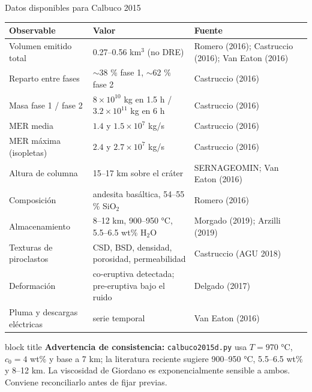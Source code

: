 \documentclass[aspectratio=169,10pt,t]{beamer}
\newcommand{\MER}{\mathrm{MER}}
\newcommand{\mensaje}[1]{%
  \vfill
  \begin{beamercolorbox}[wd=\linewidth,sep=0.4em,rounded=true]{block title}
  \footnotesize #1
  \end{beamercolorbox}}
\begin{document}
\begin{frame}{Datos disponibles para Calbuco 2015}
\centering\scriptsize
\begin{tabular}{@{}p{}p{}p{}@{}}
\toprule
\textbf{Observable} & \textbf{Valor} & \textbf{Fuente} \\
\midrule
Volumen emitido total & 0.27–0.56 km$^3$ (no DRE) & Romero (2016); Castruccio (2016); Van Eaton (2016) \\
Reparto entre fases & $\sim$38 \% fase 1, $\sim$62 \% fase 2 & Castruccio (2016) \\
Masa fase 1 / fase 2 & $8\times10^{10}$ kg en 1.5 h / $3.2\times10^{11}$ kg en 6 h & Castruccio (2016) \\
$\MER$ media & $1.4$ y $1.5\times10^7$ kg/s & Castruccio (2016) \\
$\MER$ máxima (isopletas) & $2.4$ y $2.7\times10^7$ kg/s & Castruccio (2016) \\
Altura de columna & 15–17 km sobre el cráter & SERNAGEOMIN; Van Eaton (2016) \\
Composición & andesita basáltica, 54–55 \% SiO$_2$ & Romero (2016) \\
Almacenamiento & 8–12 km, 900–950 °C, 5.5–6.5 wt\% H$_2$O & Morgado (2019); Arzilli (2019) \\
Texturas de piroclastos & CSD, BSD, densidad, porosidad, permeabilidad & Castruccio (AGU 2018) \\
Deformación & co-eruptiva detectada; pre-eruptiva bajo el ruido & Delgado (2017) \\
Pluma y descargas eléctricas & \alert{serie temporal} & Van Eaton (2016) \\
\bottomrule
\end{tabular}

\mensaje{\textbf{Advertencia de consistencia:} \texttt{calbuco2015d.py} usa
$T=970$ °C, $c_0=4$ wt\% y base a 7 km; la literatura reciente sugiere
900–950 °C, 5.5–6.5 wt\% y 8–12 km. La viscosidad de Giordano es
\alert{exponencialmente} sensible a ambos. Conviene reconciliarlo antes de fijar
previas.}
\end{frame}
\end{document}
